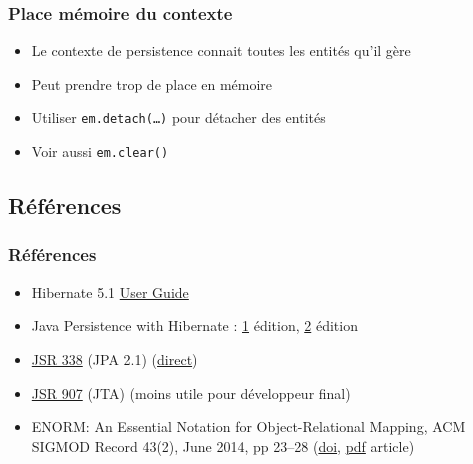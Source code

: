 \documentclass[english, french]{beamer}
\begin{document}
\begin{frame}
	\frametitle{Place mémoire du contexte}
	\begin{itemize}
		\item Le contexte de persistence connait toutes les entités qu’il gère
		\item Peut prendre trop de place en mémoire
		\item Utiliser \texttt{em.detach(…)} pour détacher des entités
		\item Voir aussi \texttt{em.clear()}
	\end{itemize}
\end{frame}


\subsection{Références}
\begin{frame}
	\frametitle{Références}
	\begin{itemize}
		\item Hibernate 5.1 \href{http://docs.jboss.org/hibernate/orm/5.1/userguide/html_single/Hibernate_User_Guide.html}{User Guide}
		\item Java Persistence with Hibernate : \href{http://gen.lib.rus.ec/book/index.php?md5=5D9F8BC8761804C0EBB8FE6A60BCF817}{1\iere} édition, \href{https://www.manning.com/books/java-persistence-with-hibernate-second-edition}{2\ieme} édition
		\item \href{https://jcp.org/en/jsr/detail?id=338}{JSR 338} (JPA 2.1) (\href{http://download.oracle.com/otn-pub/jcp/persistence-2_1-fr-eval-spec/JavaPersistence.pdf}{direct})
		\item \href{https://jcp.org/en/jsr/detail?id=907}{JSR 907} (JTA) (moins utile pour développeur final)
		\item ENORM: An Essential Notation for Object-Relational Mapping, ACM SIGMOD Record 43(2), June 2014, pp 23–28 (\href{http://dx.doi.org/10.1145/2694413.2694418}{doi}, \href{http://www.sigmod.org/publications/sigmod-record/1406/pdfs/05.articles.Torres.pdf}{pdf} article)
	\end{itemize}
\end{frame}
\end{document}
